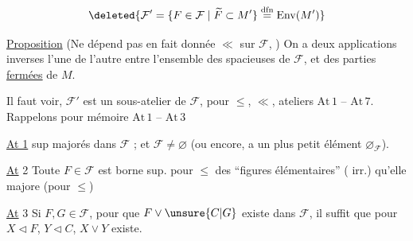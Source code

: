 
 
\[
\deleted{\mathcal F'=\{F\in\mathcal F\mid\widetilde F\subset M'\}\mathrel{\overset{\mathrm{dfn}}{=}}\mathrm{Env}(M')}
\]
 

\uline{Proposition} (Ne dépend pas en fait  donnée $\ll$ sur $\mathcal F$, ) On a deux applications  inverses l'une de l'autre
entre l'ensemble des   spacieuses  de $\mathcal F$, et  des parties \uline{fermées}  de $M$.

Il faut voir,   $\mathcal F'$ est un sous-atelier de $\mathcal F$,  pour $\leq$, $\ll$,   ateliers $\mathrm{At}\,1$ -- $\mathrm{At}\,7$. Rappelons pour mémoire $\mathrm{At}\,1$ -- $\mathrm{At}\,3$

\uline{At 1}   sup majorés   dans $\mathcal F$ ; et $\mathcal F\ne\varnothing$ (ou encore, a un plus petit élément $\varnothing_{\mathcal F}$).

\uline{At} 2 Toute  $F\in\mathcal F$ est borne sup. pour $\leq$ des ``figures élémentaires'' (   irr.) qu'elle majore (pour $\leq$)

\uline{At} 3 Si $F,G\in\mathcal F$, pour que $F\vee\unsure{C|G}$ existe dans $\mathcal F$,  il suffit que  pour $X\mathrel{\triangleleft}F$, $Y\mathrel{\triangleleft}C$, $X\vee Y$ existe.

